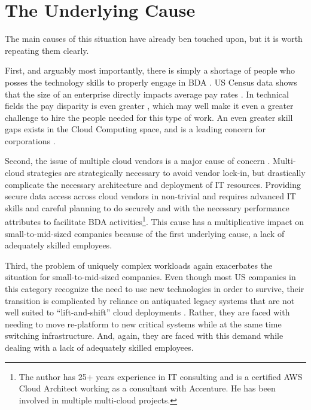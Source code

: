 \section{The Underlying Cause}

The main causes of this situation have already ben touched upon, but it is worth repeating them clearly.

First, and arguably most importantly, there is simply a shortage of people who posses the technology skills to properly engage in BDA \parencite{dawsonAdaptivelySelectingOccupations2019}. US Census data shows that the size of an enterprise directly impacts average pay rates \parencite{uscensusbureauStatisticsBusinessesEmployment}. In technical fields the pay disparity is even greater \parencite{pofeldtBigCompaniesPay2015}, which may well make it even a greater challenge to hire the people needed for this type of work.  An even greater skill gaps exists in the Cloud Computing space, and is a leading concern for corporations \parencite{sayeghCloudTalentDrought}.

Second, the issue of multiple cloud vendors is a major cause of concern \parencite{gartnerTrendsImpactingCloud2020}. Multi-cloud strategies are strategically necessary to avoid vendor lock-in, but drastically complicate the necessary architecture and deployment of IT resources. Providing secure data access across cloud vendors in non-trivial and requires advanced IT skills and careful planning to do securely and with the necessary performance attributes to facilitate BDA activities\footnote{The author has 25+ years experience in IT consulting and is a certified AWS Cloud Architect working as a consultant with Accenture. He has been involved in multiple multi-cloud projects.}. This cause has a multiplicative impact on small-to-mid-sized companies because of the first underlying cause, a lack of adequately skilled employees.

Third, the problem of uniquely complex workloads again exacerbates the situation for small-to-mid-sized companies. Even though most US companies in this category recognize the need to use new technologies in order to survive, their transition is complicated by reliance on antiquated legacy systems that are not well suited to ``lift-and-shift'' cloud deployments \parencite{smbgroupUnifiedSystemsSpringboard2021}. Rather, they are faced with needing to move re-platform to new critical systems while at the same time switching infrastructure. And, again, they are faced with this demand while dealing with a lack of adequately skilled employees.
